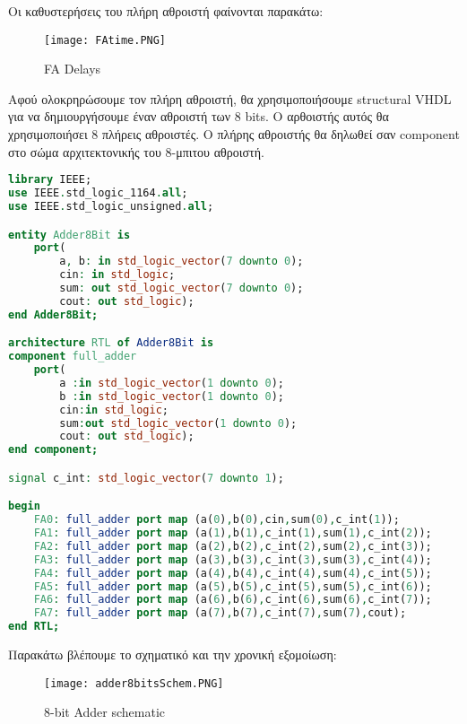 \documentclass{article}
\begin{document}
\clearpage

Οι καθυστερήσεις του πλήρη αθροιστή φαίνονται παρακάτω:

\begin{figure}[h!]
  \caption{\foreignlanguage{english}{FA Delays}}
\texttt{[image: FAtime.PNG]}
\end{figure}


Αφού ολοκρηρώσουμε τον πλήρη αθροιστή, θα χρησιμοποιήσουμε \foreignlanguage{english}{structural VHDL} για να δημιουργήσουμε έναν αθροιστή των \foreignlanguage{english}{8 bits}. Ο αρθοιστής αυτός θα χρησιμοποιήσει 8 πλήρεις αθροιστές. Ο πλήρης αθροιστής θα δηλωθεί σαν \foreignlanguage{english}{component} στο σώμα αρχιτεκτονικής του 8-μπιτου αθροιστή.

\begin{otherlanguage}{english}
\begin{lstlisting}[language=VHDL, caption= 8-bit Adder With Structural VHDL]
library IEEE;
use IEEE.std_logic_1164.all;
use IEEE.std_logic_unsigned.all;

entity Adder8Bit is
	port(
		a, b: in std_logic_vector(7 downto 0);
		cin: in std_logic;
		sum: out std_logic_vector(7 downto 0);
		cout: out std_logic);
end Adder8Bit;

architecture RTL of Adder8Bit is
component full_adder
	port(
		a :in std_logic_vector(1 downto 0);
		b :in std_logic_vector(1 downto 0);
		cin:in std_logic;
		sum:out std_logic_vector(1 downto 0);
		cout: out std_logic);
end component;

signal c_int: std_logic_vector(7 downto 1);

begin
	FA0: full_adder port map (a(0),b(0),cin,sum(0),c_int(1));
	FA1: full_adder port map (a(1),b(1),c_int(1),sum(1),c_int(2));
	FA2: full_adder port map (a(2),b(2),c_int(2),sum(2),c_int(3));
	FA3: full_adder port map (a(3),b(3),c_int(3),sum(3),c_int(4));
	FA4: full_adder port map (a(4),b(4),c_int(4),sum(4),c_int(5));
	FA5: full_adder port map (a(5),b(5),c_int(5),sum(5),c_int(6));
	FA6: full_adder port map (a(6),b(6),c_int(6),sum(6),c_int(7));
	FA7: full_adder port map (a(7),b(7),c_int(7),sum(7),cout);
end RTL;
\end{lstlisting}
\end{otherlanguage}

\clearpage

Παρακάτω βλέπουμε το σχηματικό και την χρονική εξομοίωση:

\begin{figure}[h!]
  \caption{\foreignlanguage{english}{8-bit Adder schematic}}
\texttt{[image: adder8bitsSchem.PNG]} 
\end{figure}
\end{document}
